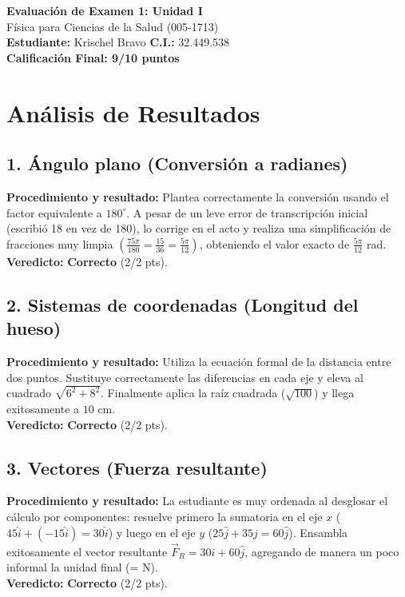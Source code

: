 \documentclass[12pt]{article}
\begin{document}
\begin{center}
    \Large \textbf{Evaluación de Examen 1: Unidad I} \\
    \large Física para Ciencias de la Salud (005-1713) \\
    \vspace{0.5cm}
    \textbf{Estudiante:} Krischel Bravo \quad \textbf{C.I.:} 32.449.538
    \vspace{0.3cm} \\
    \large \textbf{Calificación Final: 9/10 puntos}
\end{center}

\vspace{0.5cm}

\section*{Análisis de Resultados}

\subsection*{1. Ángulo plano (Conversión a radianes)}
\textbf{Procedimiento y resultado:} Plantea correctamente la conversión usando el factor equivalente a $180^\circ$. A pesar de un leve error de transcripción inicial (escribió 18 en vez de 180), lo corrige en el acto y realiza una simplificación de fracciones muy limpia $\left(\frac{75\pi}{180} = \frac{15}{36} = \frac{5\pi}{12}\right)$, obteniendo el valor exacto de $\frac{5\pi}{12}$ rad. \\
\textbf{Veredicto:} \textbf{Correcto} (2/2 pts).

\subsection*{2. Sistemas de coordenadas (Longitud del hueso)}
\textbf{Procedimiento y resultado:} Utiliza la ecuación formal de la distancia entre dos puntos. Sustituye correctamente las diferencias en cada eje y eleva al cuadrado $\sqrt{6^2 + 8^2}$. Finalmente aplica la raíz cuadrada ($\sqrt{100}$) y llega exitosamente a $10$ cm. \\
\textbf{Veredicto:} \textbf{Correcto} (2/2 pts).

\subsection*{3. Vectores (Fuerza resultante)}
\textbf{Procedimiento y resultado:} La estudiante es muy ordenada al desglosar el cálculo por componentes: resuelve primero la sumatoria en el eje $x$ ($45\hat{i} + (-15\hat{i}) = 30\hat{i}$) y luego en el eje $y$ ($25\hat{j} + 35\hat{j} = 60\hat{j}$). Ensambla exitosamente el vector resultante $\vec{F}_R = 30\hat{i} + 60\hat{j}$, agregando de manera un poco informal la unidad final (= N). \\
\textbf{Veredicto:} \textbf{Correcto} (2/2 pts).
\end{document}
